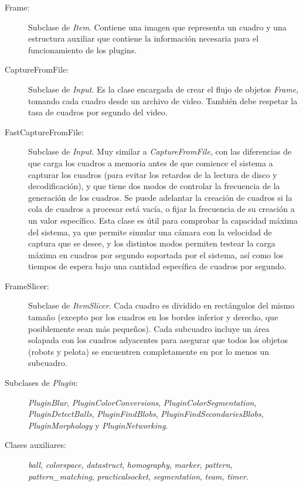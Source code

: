 \begin{description}

	\item[Frame:] Subclase de \emph{Item}. Contiene una imagen que
		representa un cuadro y una estructura auxiliar que contiene la
		información necesaria para el funcionamiento de los plugins.

	\item[CaptureFromFile:] Subclase de \emph{Input}. Es la clase encargada
		de crear el flujo de objetos \emph{Frame}, tomando cada cuadro
		desde un archivo de video. También debe respetar la tasa de
		cuadros por segundo del video.

	\item[FastCaptureFromFile:] Subclase de \emph{Input}. Muy similar a
		\emph{CaptureFromFile}, con las diferencias de que carga los
		cuadros a memoria antes de que comience el sistema a capturar
		los cuadros (para evitar los retardos de la lectura de disco y
		decodificación), y que tiene dos modos de controlar la
		frecuencia de la generación de los cuadros. Se puede adelantar
		la creación de cuadros si la cola de cuadros a procesar está
		vacía, o fijar la frecuencia de su creación a un valor
		específico. Esta clase es útil para comprobar la capacidad
		máxima del sistema, ya que permite simular una cámara con la
		velocidad de captura que se desee, y los distintos modos
		permiten testear la carga máxima en cuadros por segundo
		soportada por el sistema, así como los tiempos de espera bajo
		una cantidad específica de cuadros por segundo.

	\item[FrameSlicer:] Subclase de \emph{ItemSlicer}. Cada cuadro es
		dividido en rectángulos del mismo tamaño (excepto por los
		cuadros en los bordes inferior y derecho, que posiblemente sean
		más pequeños). Cada subcuadro incluye un área solapada con los
		cuadros adyacentes para asegurar que todos los objetos (robots y
		pelota) se encuentren completamente en por lo menos un
		subcuadro.

	\item[Subclases de \emph{Plugin}:] \emph{PluginBlur},
		\emph{PluginColorConversions}, \emph{PluginColorSegmentation},
		\emph{PluginDetectBalls}, \emph{PluginFindBlobs},
		\emph{PluginFindSecondariesBlobs}, \emph{PluginMorphology} y
		\emph{PluginNetworking}.

	\item[Clases auxiliares:] \emph{ball}, \emph{colorspace},
		\emph{datastruct}, \emph{homography}, \emph{marker},
		\emph{pattern}, \emph{pattern\_matching},
		\emph{practicalsocket}, \emph{segmentation}, \emph{team},
		\emph{timer}.

\end{description}

